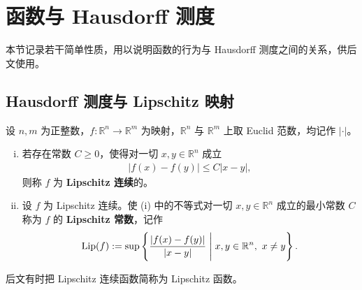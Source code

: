 \documentclass[../../main.tex]{subfiles}%
\begin{document}
\section{函数与 Hausdorff 测度}\label{section:ch02-04}

本节记录若干简单性质，用以说明函数的行为与 Hausdorff 测度之间的关系，供后文使用。

\subsection{Hausdorff 测度与 Lipschitz 映射}\label{subsection:ch02-04-1}

\begin{definition}\label{definition:ch02-2-4}
设 $n,m$ 为正整数，$f:\mathbb{R}^n\to\mathbb{R}^m$ 为映射，$\mathbb{R}^n$ 与 $\mathbb{R}^m$ 上取 Euclid 范数，均记作 $\lvert\cdot\rvert$。
\begin{enumerate}[(i)]
\item 若存在常数 $C\geqslant0$，使得对一切 $x,y\in\mathbb{R}^n$ 成立
\begin{align*}
\lvert f(x)-f(y)\rvert\leqslant C\lvert x-y\rvert ,
\end{align*}
则称 $f$ 为 \textbf{Lipschitz 连续}的。
\item 设 $f$ 为 Lipschitz 连续。使 (i) 中的不等式对一切 $x,y\in\mathbb{R}^n$ 成立的最小常数 $C$ 称为 $f$ 的 \textbf{Lipschitz 常数}，记作
\begin{align*}
\operatorname{Lip}(f):=\sup\left\{\frac{\lvert f(x)-f(y)\rvert}{\lvert x-y\rvert}\Biggm|x,y\in\mathbb{R}^n,\ x\neq y\right\}.
\end{align*}
\end{enumerate}
\end{definition}

后文有时把 Lipschitz 连续函数简称为 Lipschitz 函数。
\end{document}

